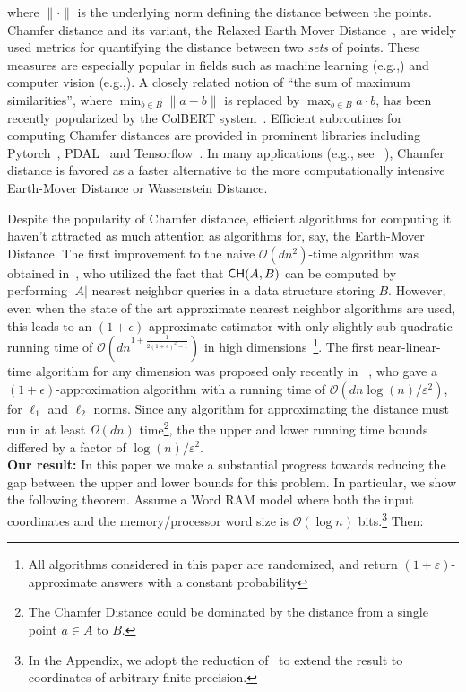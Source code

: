 \documentclass[11pt]{article}
\newcommand{\eps}{\varepsilon}
\theoremstyle{plain}
\newcommand{\OO}{\mathcal{O}}
\begin{document}
where $\|\cdot\|$ is the underlying norm defining the distance between the points. Chamfer distance and its variant, the Relaxed Earth Mover Distance~\cite{kusner2015word,atasu19a}, are widely used metrics for quantifying the distance between two {\em sets} of points. These measures are especially popular in fields such as machine learning (e.g.,\cite{kusner2015word,wan2019transductive}) and computer vision (e.g.,\cite{athitsos2003estimating,sudderth2004visual,fan2017point,jiang2018gal}). A closely related notion of ``the sum of maximum similarities'', where $\min_{b \in B} \|a-b\|$ is replaced by $\max_{b \in B} a \cdot b$, has been recently popularized by the ColBERT system~\cite{khattab2020colbert}. Efficient subroutines for computing Chamfer distances are provided in prominent libraries including Pytorch~\cite{pytorch3d}, PDAL~\cite{pdal} and Tensorflow~\cite{tensorflow}. In many applications (e.g., see ~\cite{kusner2015word}), Chamfer distance is favored as a faster alternative to the more computationally intensive Earth-Mover Distance or Wasserstein Distance. 



Despite the popularity of Chamfer distance, efficient algorithms for computing it haven't attracted as much attention as algorithms for, say, the Earth-Mover Distance. The first improvement to the naive  $\OO(dn^2)$-time algorithm was obtained in~\cite{sudderth2004visual}, who utilized the fact that $\mathsf{CH}(A,B)$ can be computed by performing $|A|$ nearest neighbor queries in a data structure storing $B$. However, even when  the state of the art approximate nearest neighbor algorithms are used, this leads to an $(1+\epsilon)$-approximate estimator with only slightly sub-quadratic running time of $\OO \left(dn^{1+\frac{1}{2 (1+\epsilon)^2 -1}}\right)$ in high dimensions~\cite{andoni2015optimal}\footnote{All algorithms considered in this paper are randomized, and return $(1+\eps)$-approximate answers with a constant probability}. The first near-linear-time algorithm for any dimension was proposed only recently in ~\cite{BIJ24}, who gave a $(1+\epsilon)$-approximation algorithm with a running time of $\OO(dn \log(n)/\eps^2)$, for $\ell_1$ and $\ell_2$ norms.
Since any algorithm for approximating the distance must run in at least $\Omega(dn)$ time\footnote{The Chamfer Distance could be dominated by the distance from a single point $a \in A$ to $B$.}, the the upper and lower running time bounds differed by a factor of $\log(n)/\eps^2$.
 \ \\
{\bf Our result:}
In this paper we make a substantial progress towards reducing the gap between the upper and lower bounds for this problem. In particular, we show the following theorem. Assume a Word RAM model where both the input coordinates and the memory/processor word size is $\OO(\log n)$ bits.\footnote{In the Appendix, we adopt the reduction of~\cite{BIJ24} to extend the result to coordinates of arbitrary finite precision.} Then:
\end{document}
